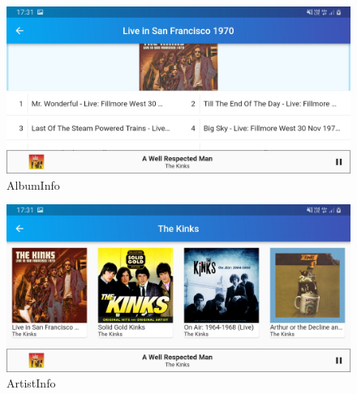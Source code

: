 \documentclass{article}
\begin{document}
\begin{figure}
    \includegraphics[width = 4.5in]{screens/19. AlbumInfo_landscape.jpg}
    \caption{AlbumInfo}
\end{figure}

\begin{figure}
    \includegraphics[width = 4.5in]{screens/20. ArtistInfo_landscape.jpg}
    \caption{ArtistInfo}
\end{figure}
\end{document}
